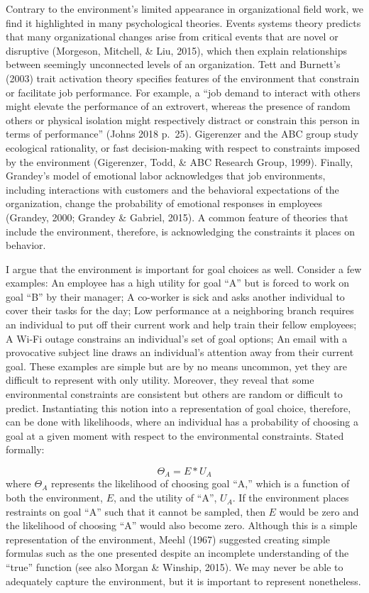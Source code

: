 \documentclass[english,,man]{apa6}
\theoremstyle{definition}
\theoremstyle{definition}
\theoremstyle{definition}
\theoremstyle{remark}
\begin{document}
Contrary to the environment's limited appearance in organizational field
work, we find it highlighted in many psychological theories. Events
systems theory predicts that many organizational changes arise from
critical events that are novel or disruptive (Morgeson, Mitchell, \&
Liu, 2015), which then explain relationships between seemingly
unconnected levels of an organization. Tett and Burnett's (2003) trait
activation theory specifies features of the environment that constrain
or facilitate job performance. For example, a \enquote{job demand to
interact with others might elevate the performance of an extrovert,
whereas the presence of random others or physical isolation might
respectively distract or constrain this person in terms of performance}
(Johns 2018 p.~25). Gigerenzer and the ABC group study ecological
rationality, or fast decision-making with respect to constraints imposed
by the environment (Gigerenzer, Todd, \& ABC Research Group, 1999).
Finally, Grandey's model of emotional labor acknowledges that job
environments, including interactions with customers and the behavioral
expectations of the organization, change the probability of emotional
responses in employees (Grandey, 2000; Grandey \& Gabriel, 2015). A
common feature of theories that include the environment, therefore, is
acknowledging the constraints it places on behavior.

I argue that the environment is important for goal choices as well.
Consider a few examples: An employee has a high utility for goal
\enquote{A} but is forced to work on goal \enquote{B} by their manager;
A co-worker is sick and asks another individual to cover their tasks for
the day; Low performance at a neighboring branch requires an individual
to put off their current work and help train their fellow employees; A
Wi-Fi outage constrains an individual's set of goal options; An email
with a provocative subject line draws an individual's attention away
from their current goal. These examples are simple but are by no means
uncommon, yet they are difficult to represent with only utility.
Moreover, they reveal that some environmental constraints are consistent
but others are random or difficult to predict. Instantiating this notion
into a representation of goal choice, therefore, can be done with
likelihoods, where an individual has a probability of choosing a goal at
a given moment with respect to the environmental constraints. Stated
formally:

\begin{equation}
\Theta_{A} = E * U_{A}
\end{equation} \noindent where \(\Theta_{A}\) represents the likelihood
of choosing goal \enquote{A,} which is a function of both the
environment, \(E\), and the utility of \enquote{A}, \(U_{A}\). If the
environment places restraints on goal \enquote{A} such that it cannot be
sampled, then \(E\) would be zero and the likelihood of choosing
\enquote{A} would also become zero. Although this is a simple
representation of the environment, Meehl (1967) suggested creating
simple formulas such as the one presented despite an incomplete
understanding of the \enquote{true} function (see also Morgan \&
Winship, 2015). We may never be able to adequately capture the
environment, but it is important to represent nonetheless.
\end{document}
